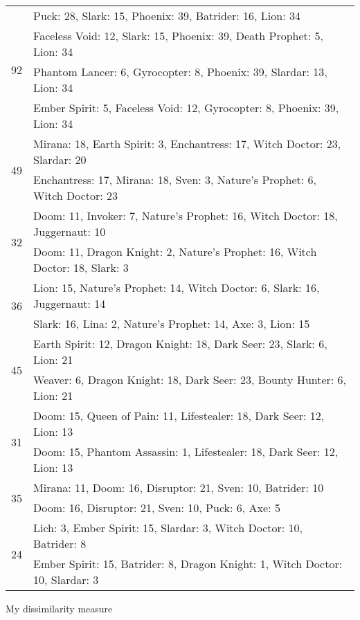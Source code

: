 \begin{table}[H]
\begin{tabular}{ | c | p{12.5cm} | }
\hline
\multirow{4}{*}{92}
& Puck: 28, Slark: 15, Phoenix: 39, Batrider: 16, Lion: 34 \\
& Faceless Void: 12, Slark: 15, Phoenix: 39, Death Prophet: 5, Lion: 34 \\
& Phantom Lancer: 6, Gyrocopter: 8, Phoenix: 39, Slardar: 13, Lion: 34 \\
& Ember Spirit: 5, Faceless Void: 12, Gyrocopter: 8, Phoenix: 39, Lion: 34 \\
\hline
\multirow{2}{*}{49}
& Mirana: 18, Earth Spirit: 3, Enchantress: 17, Witch Doctor: 23, Slardar: 20 \\
& Enchantress: 17, Mirana: 18, Sven: 3, Nature's Prophet: 6, Witch Doctor: 23 \\
\hline
\multirow{2}{*}{32}
& Doom: 11, Invoker: 7, Nature's Prophet: 16, Witch Doctor: 18, Juggernaut: 10 \\
& Doom: 11, Dragon Knight: 2, Nature's Prophet: 16, Witch Doctor: 18, Slark: 3 \\
\hline
\multirow{2}{*}{36}
& Lion: 15, Nature's Prophet: 14, Witch Doctor: 6, Slark: 16, Juggernaut: 14 \\
& Slark: 16, Lina: 2, Nature's Prophet: 14, Axe: 3, Lion: 15 \\
\hline
\multirow{2}{*}{45}
& Earth Spirit: 12, Dragon Knight: 18, Dark Seer: 23, Slark: 6, Lion: 21 \\
& Weaver: 6, Dragon Knight: 18, Dark Seer: 23, Bounty Hunter: 6, Lion: 21 \\
\hline
\multirow{2}{*}{31}
& Doom: 15, Queen of Pain: 11, Lifestealer: 18, Dark Seer: 12, Lion: 13 \\
& Doom: 15, Phantom Assassin: 1, Lifestealer: 18, Dark Seer: 12, Lion: 13 \\
\hline
\multirow{2}{*}{35}
& Mirana: 11, Doom: 16, Disruptor: 21, Sven: 10, Batrider: 10 \\
& Doom: 16, Disruptor: 21, Sven: 10, Puck: 6, Axe: 5 \\
\hline
\multirow{2}{*}{24}
& Lich: 3, Ember Spirit: 15, Slardar: 3, Witch Doctor: 10, Batrider: 8 \\
& Ember Spirit: 15, Batrider: 8, Dragon Knight: 1, Witch Doctor: 10, Slardar: 3 \\
\hline
    \end{tabular}
    \caption{}
    \label{}
    \end{table}

My dissimilarity measure

